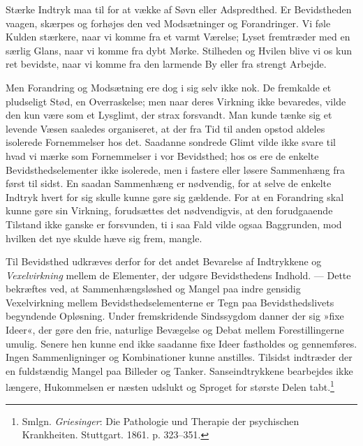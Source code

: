 \documentclass[12pt,a4paper,openany]{book}
\newcommand{\opage}[1]{\marginnote{\footnotesize\textit{[#1]}}}
\begin{document}
Stærke Indtryk maa til for at vække af Søvn eller Adspredthed. Er
Bevidstheden vaagen, skærpes og forhøjes den ved Modsætninger og
Forandringer. Vi føle Kulden stærkere, naar vi komme fra et varmt
Værelse; Lyset fremtræder med en særlig Glans, naar vi komme fra dybt
Mørke. Stilheden og Hvilen blive vi os kun ret bevidste, naar vi komme
fra den larmende By eller fra strengt Arbejde.


\opage{56}Men Forandring og Modsætning ere dog i sig selv ikke nok. De
fremkalde et pludseligt Stød, en Overraskelse; men naar deres Virkning
ikke bevaredes, vilde den kun være som et Lysglimt, der strax forsvandt.
Man kunde tænke sig et levende Væsen saaledes organiseret, at der fra
Tid til anden opstod aldeles isolerede Fornemmelser hos det. Saadanne
sondrede Glimt vilde ikke svare til hvad vi mærke som Fornemmelser i vor
Bevidsthed; hos os ere de enkelte Bevidsthedselementer ikke isolerede,
men i fastere eller løsere Sammenhæng fra først til sidst. En saadan
Sammenhæng er nødvendig, for at selve de enkelte Indtryk hvert for sig
skulle kunne gøre sig gældende. For at en Forandring skal kunne gøre sin
Virkning, forudsættes det nødvendigvis, at den forudgaaende Tilstand
ikke ganske er forsvunden, ti i saa Fald vilde ogsaa Baggrunden, mod
hvilken det nye skulde hæve sig frem, mangle.

Til Bevidsthed udkræves derfor for det andet Bevarelse af Indtrykkene og
\emph{Vexelvirkning} mellem de Elementer, der udgøre Bevidsthedens
Indhold. --- Dette bekræftes ved, at Sammenhængsløshed og Mangel paa
indre gensidig Vexelvirkning mellem Bevidsthedselementerne er Tegn paa
Bevidsthedslivets begyndende Opløsning. Under fremskridende Sindssygdom
danner der sig »fixe Ideer«, der gøre den frie, naturlige Bevægelse og
Debat mellem Forestillingerne umulig. Senere hen kunne end ikke saadanne
fixe Ideer fastholdes og gennemføres. Ingen Sammenligninger og
Kombinationer kunne anstilles. Tilsidst indtræder der en fuldstændig
Mangel paa Billeder og Tanker. Sanseindtrykkene bearbejdes ikke længere,
Hukommelsen er næsten udslukt og Sproget for største Delen
tabt.\footnote[1]{Smlgn. \emph{Griesinger}: Die Pathologie und Therapie
der psychischen Krankheiten. Stuttgart. 1861. p. 323--351.}
\end{document}

